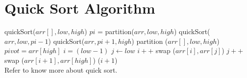 \documentclass[12pt]{article}%
\begin{document}
\pagecolor{white}
\section{Quick Sort Algorithm}
\begin{algorithmic}
\STATE quickSort($arr[], low, high$)
{
    {
        \STATE $pi$ = partition($arr, low, high$)\;
        \STATE quickSort($arr, low, pi - 1$)\; 
        \STATE quickSort($arr, pi + 1, high$)\; 
    } \ENDIF
}
\STATE partition ($arr[], low, high$)
{
    \STATE $pivot = arr[high]$\;  
    \STATE $i = (low - 1)$\;
    \STATE $j \gets low $\;
    {
        {
            \STATE $i++$\;    
            \STATE swap ($arr[i],arr[j]$)\;
        } \ENDIF
        \STATE $j++$\;
    } \ENDWHILE
    \STATE swap ($arr[i + 1],arr[high]$)\;
    \STATE \RETURN ($i + 1$)
}
\\Refer \cite{10.1145/1498698.1564500} to know more about quick sort.\\

\newpage




\end{algorithmic}
\end{document}
